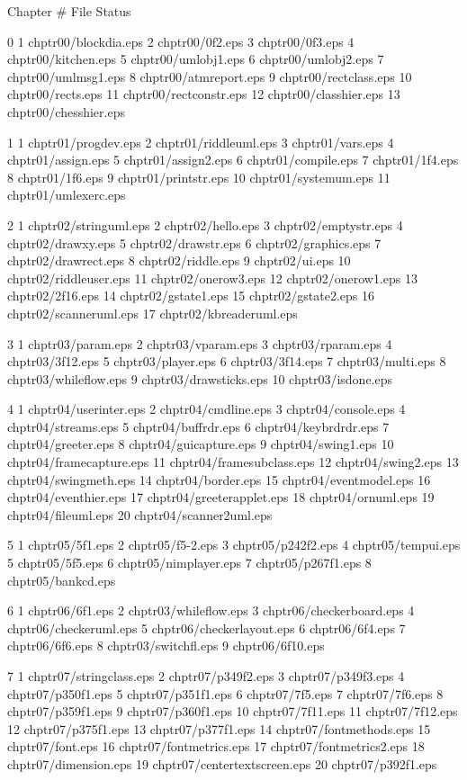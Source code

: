 Chapter	#	File				Status

0       1	chptr00/blockdia.eps
	2	chptr00/0f2.eps
	3	chptr00/0f3.eps
	4	chptr00/kitchen.eps
	5	chptr00/umlobj1.eps
	6	chptr00/umlobj2.eps
	7	chptr00/umlmsg1.eps
	8	chptr00/atmreport.eps
	9	chptr00/rectclass.eps
	10	chptr00/rects.eps
	11	chptr00/rectconstr.eps
	12	chptr00/classhier.eps
	13	chptr00/chesshier.eps

1	1	chptr01/progdev.eps
	2	chptr01/riddleuml.eps
	3	chptr01/vars.eps
	4	chptr01/assign.eps
	5	chptr01/assign2.eps
	6	chptr01/compile.eps
	7	chptr01/1f4.eps
	8	chptr01/1f6.eps
	9	chptr01/printstr.eps
	10	chptr01/systemum.eps
	11	chptr01/umlexerc.eps

2	1	chptr02/stringuml.eps
	2	chptr02/hello.eps
	3	chptr02/emptystr.eps
	4	chptr02/drawxy.eps
	5	chptr02/drawstr.eps
	6	chptr02/graphics.eps
	7	chptr02/drawrect.eps
	8	chptr02/riddle.eps
	9	chptr02/ui.eps
	10	chptr02/riddleuser.eps
	11	chptr02/onerow3.eps
	12	chptr02/onerow1.eps
	13	chptr02/2f16.eps
	14	chptr02/gstate1.eps
	15	chptr02/gstate2.eps
	16	chptr02/scanneruml.eps
	17	chptr02/kbreaderuml.eps

3	1	chptr03/param.eps
	2	chptr03/vparam.eps
	3	chptr03/rparam.eps
	4	chptr03/3f12.eps
	5	chptr03/player.eps
	6	chptr03/3f14.eps
	7	chptr03/multi.eps
	8	chptr03/whileflow.eps
	9	chptr03/drawsticks.eps
	10	chptr03/isdone.eps

4	1	chptr04/userinter.eps
	2	chptr04/cmdline.eps
	3	chptr04/console.eps
	4	chptr04/streams.eps
	5	chptr04/buffrdr.eps
	6	chptr04/keybrdrdr.eps
	7	chptr04/greeter.eps
	8	chptr04/guicapture.eps
	9	chptr04/swing1.eps
	10	chptr04/framecapture.eps
	11	chptr04/framesubclass.eps
	12	chptr04/swing2.eps
	13	chptr04/swingmeth.eps
	14	chptr04/border.eps
	15	chptr04/eventmodel.eps
	16	chptr04/eventhier.eps
	17	chptr04/greeterapplet.eps
	18	chptr04/ornuml.eps
	19	chptr04/fileuml.eps
	20	chptr04/scanner2uml.eps

5	1	chptr05/5f1.eps
	2	chptr05/f5-2.eps
	3	chptr05/p242f2.eps
	4	chptr05/tempui.eps
	5	chptr05/5f5.eps
	6	chptr05/nimplayer.eps
	7	chptr05/p267f1.eps
	8	chptr05/bankcd.eps

6	1	chptr06/6f1.eps
	2	chptr03/whileflow.eps
	3	chptr06/checkerboard.eps
	4	chptr06/checkeruml.eps
	5	chptr06/checkerlayout.eps
	6	chptr06/6f4.eps
	7	chptr06/6f6.eps
	8	chptr03/switchfl.eps
	9	chptr06/6f10.eps

7	1	chptr07/stringclass.eps
	2	chptr07/p349f2.eps
	3	chptr07/p349f3.eps
	4	chptr07/p350f1.eps
	5	chptr07/p351f1.eps
	6	chptr07/7f5.eps
	7	chptr07/7f6.eps
	8	chptr07/p359f1.eps
	9	chptr07/p360f1.eps
	10	chptr07/7f11.eps
	11	chptr07/7f12.eps
	12	chptr07/p375f1.eps
	13	chptr07/p377f1.eps
	14	chptr07/fontmethods.eps
	15	chptr07/font.eps
	16	chptr07/fontmetrics.eps
	17	chptr07/fontmetrics2.eps
	18	chptr07/dimension.eps
	19	chptr07/centertextscreen.eps
	20	chptr07/p392f1.eps

